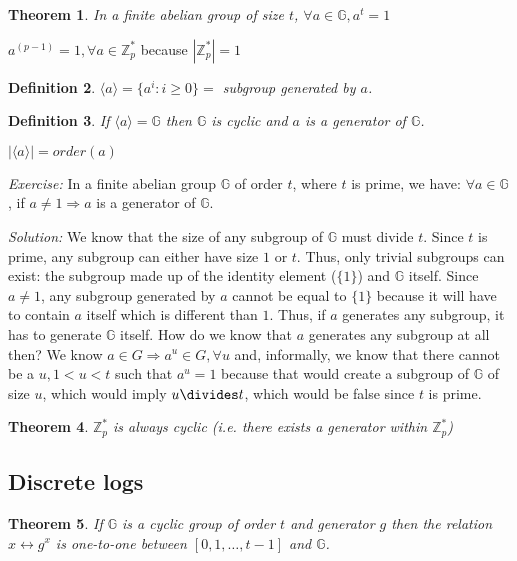 \documentclass[12pt]{article}
\newtheorem{thm}{Theorem}[section]
\newtheorem{definition}[thm]{Definition}
\newcommand{\Zp}{\mathbb{Z}^{\ast}_p}
\newcommand{\G}{\mathbb{G}}
\newcommand{\gen}[1]{\langle #1 \rangle}
\begin{document}
\begin{thm}
In a finite abelian group of size $t$, $\forall a \in \G, a^t = 1$
\end{thm}

\begin{example}
$a^{(p-1)} = 1, \forall a \in \Zp$ because $|\Zp| = 1$
\end{example}

\begin{definition}
$\gen{a} = \{a^i : i \ge 0\} = $ subgroup generated by $a$.
\end{definition}

\begin{definition}
If $\gen{a} = \G$ then $\G$ is \emph{cyclic} and $a$ is a
\emph{generator} of $\G$.
\end{definition}

\begin{note}
$|\gen{a}| = order(a)$
\end{note}

\emph{Exercise:} In a finite abelian group $\G$ of order $t$, where $t$ is
prime, we have: $\forall a \in \G$, if $a \ne 1 \Rightarrow a$ is a generator of $\G$.

\emph{Solution:} We know that the size of any subgroup of $\G$ must divide $t$.
Since $t$ is prime, any subgroup can either have size $1$ or $t$. Thus, only
trivial subgroups can exist: the subgroup made up of the identity element
($\{1\}$) and $\G$ itself. Since $a \ne 1$, any subgroup generated by $a$ cannot
be equal to $\{1\}$ because it will have to contain $a$ itself which is
different than $1$.  Thus, if $a$ generates any subgroup, it has to generate
$\G$ itself. How do we know that $a$ generates any subgroup at all then? We know
$a \in G \Rightarrow a^u \in G, \forall u$ and, informally, we know that there
cannot be a $u, 1 < u < t$ such that $a^u = 1$ because that would create a
subgroup of $\G$ of size $u$, which would imply $u \divides t$, which would be
false since $t$ is prime.

\begin{thm}
$\Zp$ is always cyclic (i.e. there exists a generator within $\Zp$)
\end{thm}


\subsection{Discrete logs}

\begin{thm}
If $\G$ is a cyclic group of order $t$ and generator $g$ then the relation
$x \leftrightarrow g^x$ is one-to-one between $[0, 1, \dots, t-1]$ and $\G$.
\end{thm}
\end{document}

